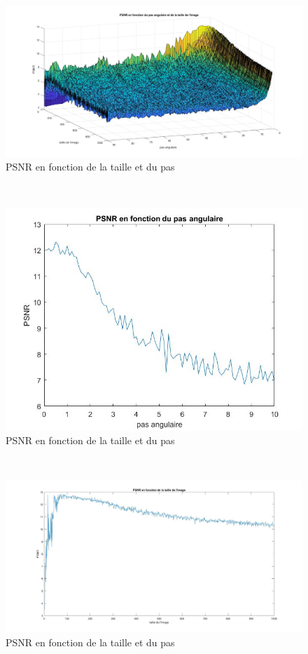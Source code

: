 \documentclass[conference]{IEEEtran}
\begin{document}
\newpage
\newpage
\begin{figure}[H]
\centering
\includegraphics[scale=0.40, angle=-90]{PSNR1}
	\caption[PSNR en fonction de la taille et du pas]{PSNR en fonction de la taille et du pas}
\label{fig:gallery}
\end{figure}

\newpage $ $
\newpage

\begin{figure}[H]
\centering
\includegraphics[scale=1, angle=-90]{PSNR_en_fonction_du_pas_angulaire}
	\caption[PSNR en fonction du pas]{PSNR en fonction de la taille et du pas}
\label{fig:gallery}
\end{figure}

\newpage $ $
\begin{figure}[H]
\centering
\includegraphics[scale=0.40, angle=-90]{PSNR3}
	\caption[PSNR en fonction de la taille]{PSNR en fonction de la taille et du pas}
\label{fig:gallery}
\end{figure}




\end{document}
